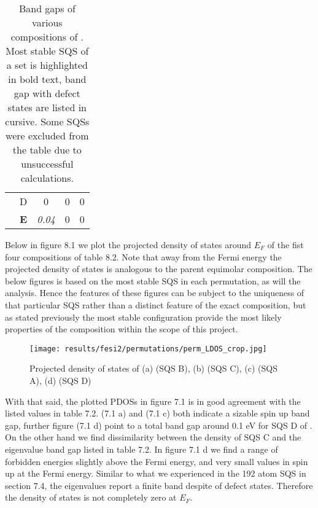 \begin{table}[H]
\begin{tabular}{@{}ccccc@{}}
\multicolumn{1}{c|}{}                                       & D          & 0                                                                           & 0                                                                           & 0                                                                                 \\
\multicolumn{1}{c|}{}                                       & \textbf{E} & \textit{0.04}                                                               & 0                                                                           & 0                                                                                 \\ \bottomrule 
\end{tabular}
\caption{Band gaps of various compositions of . Most stable SQS of a set is highlighted in bold text, band gap with defect states are listed in cursive. Some SQSs were excluded from the table due to unsuccessful calculations.}
\end{table}
\newpage

Below in figure 8.1 we plot the projected density of states around $E_F$ of the fist four compositions of table 8.2. Note that away from the Fermi energy the projected density of states is analogous to the parent equimolar composition. The below figures is based on the most stable SQS in each permutation, as will the analysis. Hence the features of these figures can be subject to the uniqueness of that particular SQS rather than a distinct feature of the exact composition, but as stated previously the most stable configuration provide the most likely properties of the composition within the scope of this project. 

\begin{figure}[H]
\texttt{[image: results/fesi2/permutations/perm\_LDOS\_crop.jpg]}
\caption{Projected density of states of (a)  (SQS B), (b)  (SQS C), (c)  (SQS A), (d)  (SQS D)}
\end{figure}

With that said, the plotted PDOSs in figure 7.1 is in good agreement with the listed values in table 7.2.  (7.1 a) and  (7.1 c) both indicate a sizable spin up band gap, further figure (7.1 d) point to a total band gap around 0.1 eV for SQS D of . On the other hand we find dissimilarity between the density of  SQS C and the eigenvalue band gap listed in table 7.2. In figure 7.1 d we find a range of forbidden energies slightly above the Fermi energy, and very small values in spin up at the Fermi energy. Similar to what we experienced in the 192 atom SQS in section 7.4, the eigenvalues report a finite band despite of defect states. Therefore the density of states is not completely zero at $E_F$. 

